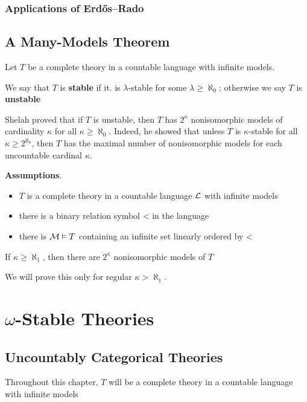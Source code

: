 \documentclass[11pt]{article}
\begin{document}
\subsubsection{Applications of Erdős–Rado}
\label{sec:orgd6c5420}
\subsection{A Many-Models Theorem}
\label{sec:org0f671a6}
Let \(T\) be a complete theory in a countable language with infinite models.
\begin{definition}[]
We say that \(T\) is \textbf{stable} if it. is \(\lambda\)-stable for some \(\lambda\ge\aleph_0\); otherwise we say \(T\) is \textbf{unstable}
\end{definition}

Shelah proved that if \(T\) is unstable, then \(T\) has \(2^\kappa\) nonisomorphic models of
cardinality \(\kappa\) for all \(\kappa\ge\aleph_0\). Indeed, he showed that unless \(T\) is \(\kappa\)-stable for
all \(\kappa\ge 2^{\aleph_0}\), then \(T\) has the maximal number of nonisomorphic models for each
uncountable cardinal \(\kappa\).

\textbf{Assumptions}.
\begin{itemize}
\item \(T\) is a complete theory in a countable language \(\mathcal{L}\) with infinite models
\item there is a binary relation symbol < in the language
\item there is \(\mathcal{M}\vDash T\) containing an infinite set linearly ordered by <
\end{itemize}


\begin{theorem}[]
If \(\kappa\ge\aleph_1\), then there are \(2^\kappa\) nonisomorphic models of \(T\)
\end{theorem}

We will prove this only for regular \(\kappa>\aleph_1\).
\section{\texorpdfstring{\(\omega\)}{ω}-Stable Theories}
\label{sec:org76bc187}
\subsection{Uncountably Categorical Theories}
\label{sec:org9e44656}
Throughout this chapter, \(T\) will be a complete theory in a countable language with infinite
models
\end{document}

